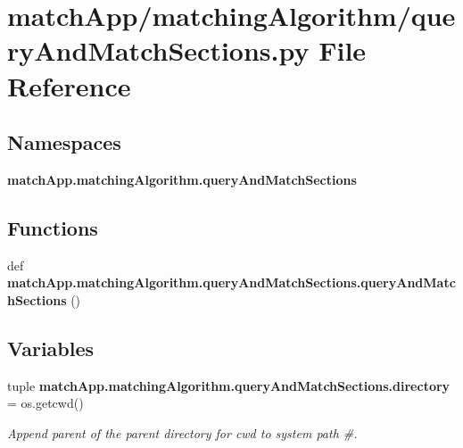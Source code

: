 \section{match\+App/matching\+Algorithm/query\+And\+Match\+Sections.py File Reference}
\label{query_and_match_sections_8py}
\subsection*{Namespaces}
\begin{DoxyCompactItemize}
\item 
 {\bf match\+App.\+matching\+Algorithm.\+query\+And\+Match\+Sections}
\end{DoxyCompactItemize}
\subsection*{Functions}
\begin{DoxyCompactItemize}
\item 
def {\bf match\+App.\+matching\+Algorithm.\+query\+And\+Match\+Sections.\+query\+And\+Match\+Sections} ()
\end{DoxyCompactItemize}
\subsection*{Variables}
\begin{DoxyCompactItemize}
\item 
tuple {\bf match\+App.\+matching\+Algorithm.\+query\+And\+Match\+Sections.\+directory} = os.\+getcwd()
\begin{DoxyCompactList}\small\item\em Append parent of the parent directory for cwd to system path \#. \end{DoxyCompactList}\end{DoxyCompactItemize}

